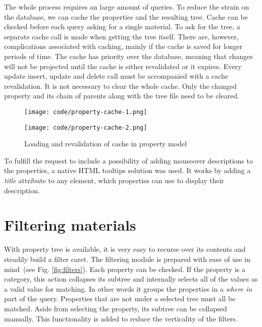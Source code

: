 \documentclass[
  digital,     %
  oneside,     %
  nosansbold,  %
  colorbold, %
  lof,         %
  lot,         %
]{fithesis4}
\newcommand{\imgref}[1]{(see Fig. \ref{fig:#1})}
\begin{document}
The whole process requires an large amount of queries. To reduce the strain on the database, we can
cache the properties and the resulting tree. Cache can be checked before each query asking for a
single material. To ask for the tree, a separate cache call is made when getting the tree itself. There
are, however, complications associated with caching, mainly if the cache is saved for longer periods of
time. The cache has priority over the database, meaning that changes will not be projected until the
cache is either revalidated or it expires. Every update insert, update and delete call must be
accompanied with a cache revalidation. It is not necessary to clear the whole cache. Only the changed
property and its chain of parents along with the tree file need to be cleared.

\begin{figure}[!htbp]
	\begin{center}
		\begin{minipage}{.8\textwidth}
			\texttt{[image: code/property-cache-1.png]}
		\end{minipage}
		\begin{minipage}{.8\textwidth}
			\texttt{[image: code/property-cache-2.png]}
		\end{minipage}
	\end{center}
	\caption{Loading and revalidation of cache in property model}
	\label{fig:property-cache}
\end{figure}

To fulfill the request to include a possibility of adding mouseover descriptions to the properties, a
native HTML tooltips solution was used. It works by adding a \textit{title} attribute to any element,
which properties can use to display their description.

\newpage

\section{Filtering materials}

With property tree is available, it is very easy to recurse over its contents and steadily build a filter
caret. The filtering module is prepared with ease of use in mind~\imgref{filters}. Each property can be
checked. If the property is a category, this action collapses its subtree and internally selects all of the
values as a valid value for matching. In other words it groups the properties in a \textit{where in} part
of the query. Properties that are not under a selected tree must all be matched. Aside from selecting
the property, its subtree can be collapsed manually. This functionality is added to reduce the
verticality of the filters.
\end{document}
